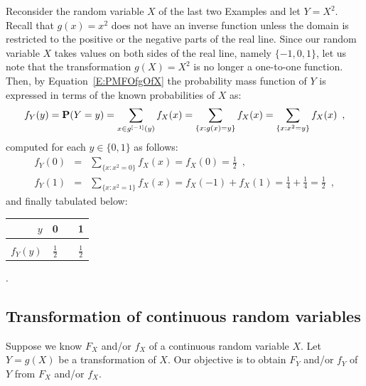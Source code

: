 \begin{example}
Reconsider the random variable $X$ of the last two Examples and let $Y=X^2$.  
Recall that $g(x)=x^2$ does not have an inverse function unless the domain is restricted to the positive or the negative parts of the real line.  
Since our random variable $X$ takes values on both sides of the real line, namely $\{-1,0,1\}$, let us note that the transformation $g(X)=X^2$ is no longer a one-to-one function.  
Then, by Equation~\eqref{E:PMFOfgOfX} the probability mass function of $Y$ is expressed in terms of the known probabilities of $X$ as:\\ 
\[
f_Y(y)=\mathbf{P}(Y=y)= \sum_{x \in g^{[-1]}(y)} f_X(x)  = \sum_{\{x:g(x)=y\}} f_X(x) = \sum_{\{x:x^2=y\}} f_X(x) \enspace ,
\]
computed for each $y \in \{0,1\}$ as follows:
\begin{eqnarray*}
f_Y(0) &=& \sum_{\{x:x^2=0\}} f_X(x) = f_X(0)=\frac{1}{2} \enspace ,\\
f_Y(1) &=& \sum_{\{x:x^2=1\}} f_X(x) = f_X(-1)+f_X(1)=\frac{1}{4}+\frac{1}{4}=\frac{1}{2} \enspace ,
\end{eqnarray*}
and finally tabulated below:\\
\begin{center}
\begin{tabular}{r|ccc}
$y$ & 0 & & 1\\ \hline
 &  &  & \\ 
$f_Y(y)$ & $\frac{1}{2}$ & \quad & $\frac{1}{2}$
\end{tabular}\enspace .
\end{center}
\end{example}



\subsection{Transformation of continuous random variables}
Suppose we know $F_X$ and/or $f_X$ of a continuous random variable $X$.  
Let $Y=g(X)$ be a transformation of $X$.  
Our objective is to obtain $F_Y$ and/or $f_Y$ of $Y$ from $F_X$ and/or $f_X$.  

